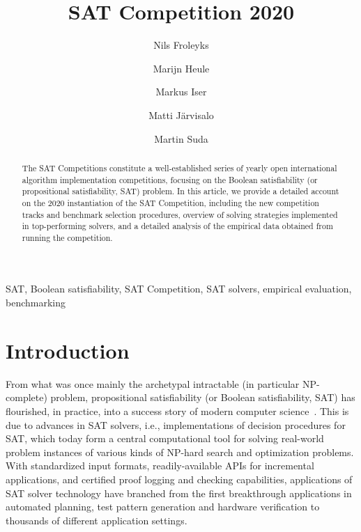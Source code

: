 \documentclass{elsarticle}
\title{SAT Competition 2020\tnoteref{title}}
\author[jku]{Nils Froleyks}
\author[cmu]{Marijn Heule}
\author[kit]{Markus Iser}
\author[uh]{Matti J\"arvisalo}
\author[ctu]{Martin Suda}
\begin{document}
\begin{abstract}
The SAT Competitions constitute a well-established series of yearly open international algorithm implementation competitions,
focusing on the Boolean satisfiability (or propositional satisfiability, SAT) problem. 
In this article, we provide
a detailed account on the 2020 instantiation of the SAT Competition, including the 
 new competition tracks and benchmark selection procedures, overview of solving strategies implemented in top-performing solvers, 
and a detailed analysis of the empirical data obtained from running the competition.
\end{abstract}

\begin{keyword}
SAT, Boolean satisfiability, SAT Competition, SAT solvers, empirical evaluation,
benchmarking
\end{keyword}

\maketitle



\section{Introduction}


From what was once mainly the archetypal intractable (in particular NP-complete) problem, propositional satisfiability 
(or Boolean satisfiability, SAT) has flourished, in practice, into a success story of modern computer science~\cite{DBLP:series/faia/2009-185}.
This is due to advances in SAT solvers, i.e., implementations of decision procedures for SAT, which today form a 
central computational tool for solving real-world problem instances of various kinds of NP-hard search and optimization problems.
With standardized input formats, readily-available APIs for incremental applications,
and certified proof logging and checking capabilities, applications of SAT solver technology
have branched from the first breakthrough applications in automated planning, test pattern generation and hardware verification
to thousands of different application settings. 
\end{document}
